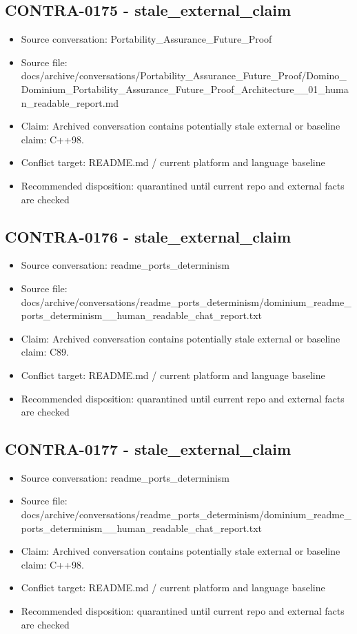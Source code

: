 \documentclass[11pt,a4paper]{report}
\begin{document}
\subsection{CONTRA-0175 - stale\_external\_claim}

\begin{itemize}
\item Source conversation: Portability\_Assurance\_Future\_Proof
\item Source file: docs/archive/conversations/Portability\_Assurance\_Future\_Proof/Domino\_Dominium\_Portability\_Assurance\_Future\_Proof\_Architecture\_\_01\_human\_readable\_report.md
\item Claim: Archived conversation contains potentially stale external or baseline claim: C++98.
\item Conflict target: README.md / current platform and language baseline
\item Recommended disposition: quarantined until current repo and external facts are checked
\end{itemize}

\subsection{CONTRA-0176 - stale\_external\_claim}

\begin{itemize}
\item Source conversation: readme\_ports\_determinism
\item Source file: docs/archive/conversations/readme\_ports\_determinism/dominium\_readme\_ports\_determinism\_\_human\_readable\_chat\_report.txt
\item Claim: Archived conversation contains potentially stale external or baseline claim: C89.
\item Conflict target: README.md / current platform and language baseline
\item Recommended disposition: quarantined until current repo and external facts are checked
\end{itemize}

\subsection{CONTRA-0177 - stale\_external\_claim}

\begin{itemize}
\item Source conversation: readme\_ports\_determinism
\item Source file: docs/archive/conversations/readme\_ports\_determinism/dominium\_readme\_ports\_determinism\_\_human\_readable\_chat\_report.txt
\item Claim: Archived conversation contains potentially stale external or baseline claim: C++98.
\item Conflict target: README.md / current platform and language baseline
\item Recommended disposition: quarantined until current repo and external facts are checked
\end{itemize}
\end{document}
